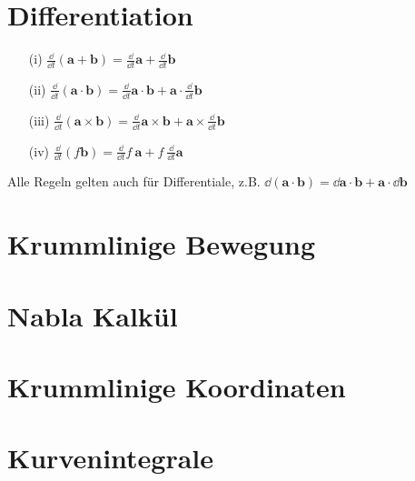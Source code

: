 
\section{Differentiation}

\begin{framedprop}
	\begin{enumerate}
		\item[(i)] $\frac{\dd}{\dd t} (\mathbf{a} + \mathbf{b}) = \frac{\dd}{\dd t} \mathbf{a} + \frac{\dd}{\dd t} \mathbf{b}$
		
		\item[(ii)] $\frac{\dd}{\dd t} (\mathbf{a} \cdot \mathbf{b}) = \frac{\dd}{\dd t} \mathbf{a} \cdot \mathbf{b} + \mathbf{a} \cdot \frac{\dd}{\dd t} \mathbf{b}$
		
		\item[(iii)] $\frac{\dd}{\dd t} (\mathbf{a} \times \mathbf{b}) = \frac{\dd}{\dd t} \mathbf{a} \times \mathbf{b} + \mathbf{a} \times \frac{\dd}{\dd t} \mathbf{b}$
		
		\item[(iv)] $\frac{\dd}{\dd t} (f \mathbf{b}) = \frac{\dd}{\dd t} f \  \mathbf{a} + f \  \frac{\dd}{\dd t} \mathbf{a}$
	\end{enumerate}

Alle Regeln gelten auch für Differentiale, z.B. $\dd (\mathbf{a} \cdot \mathbf{b}) = \dd \mathbf{a} \cdot \mathbf{b} + \mathbf{a} \cdot \dd \mathbf{b}$
\end{framedprop}

\section{Krummlinige Bewegung}

\section{Nabla Kalkül}

\section{Krummlinige Koordinaten}

\section{Kurvenintegrale}